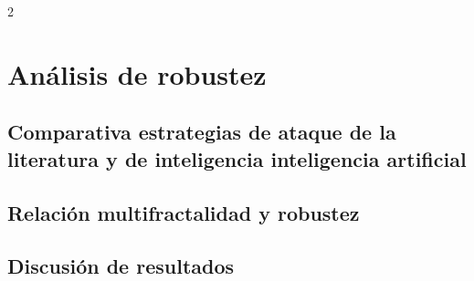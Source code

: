 2\section{Análisis de robustez}

\subsection{Comparativa estrategias de ataque de la literatura y de inteligencia inteligencia artificial}

\subsection{Relación multifractalidad y robustez}

\subsection{Discusión de resultados}